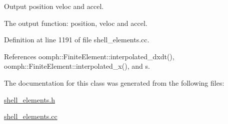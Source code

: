 Output position veloc and accel. 

The output function\+: position, veloc and accel. 

Definition at line 1191 of file shell\+\_\+elements.\+cc.



References oomph\+::\+Finite\+Element\+::interpolated\+\_\+dxdt(), oomph\+::\+Finite\+Element\+::interpolated\+\_\+x(), and s.



The documentation for this class was generated from the following files\+:\begin{DoxyCompactItemize}
\item 
\hyperlink{shell__elements_8h}{shell\+\_\+elements.\+h}\item 
\hyperlink{shell__elements_8cc}{shell\+\_\+elements.\+cc}\end{DoxyCompactItemize}
